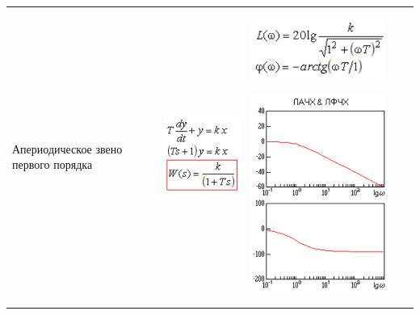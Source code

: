 \documentclass[14pt,a4paper,report]{report}
\begin{document}
\begin{table}[h!]
\begin{tabular}{ | m{3cm} | m{3.5cm} | m{4.5cm} | m{2.5cm} | m{2.5cm} }
		Апериодическое звено первого порядка
		&
		\begin{minipage}{.3\textwidth}
			\includegraphics[scale = 0.5]{images/4_2.png}
		\end{minipage}
		&
		\begin{minipage}{.3\textwidth}
			\includegraphics[scale = 0.5]{images/4_3_f.png}
		\end{minipage}
		\begin{minipage}{.3\textwidth}
			\includegraphics[scale = 0.5]{images/4_3.png}
		\end{minipage}
		&
		\begin{minipage}{.3\textwidth}

\end{minipage}
\end{tabular}
\end{table}
\end{document}

